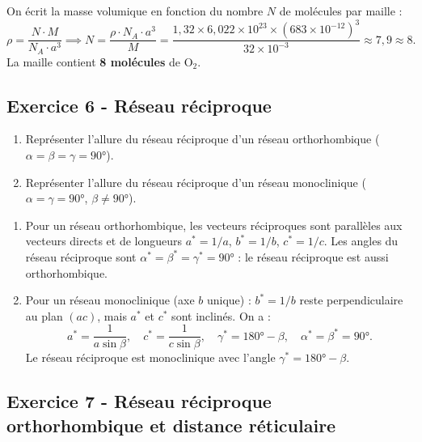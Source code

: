 \documentclass[12pt,a4paper]{article}
\begin{document}
\begin{boitecorrige}
On écrit la masse volumique en fonction du nombre $N$ de molécules par maille :
\[
\rho = \frac{N\cdot M}{N_A\cdot a^3}
\implies N = \frac{\rho\cdot N_A\cdot a^3}{M}
= \frac{1{,}32 \times 6{,}022\times10^{23} \times (683\times10^{-12})^3}{32\times10^{-3}}
\approx 7{,}9 \approx 8.
\]
La maille contient \textbf{8 molécules} de $\text{O}_2$.
\end{boitecorrige}

\subsection*{Exercice 6 - Réseau réciproque \niveau{\moyen}}

\begin{boiteexercice}
\niveau{\moyen}
\begin{enumerate}
  \item Représenter l'allure du réseau réciproque d'un réseau orthorhombique ($\alpha=\beta=\gamma=90°$).
  \item Représenter l'allure du réseau réciproque d'un réseau monoclinique ($\alpha=\gamma=90°$, $\beta\neq90°$).
\end{enumerate}
\end{boiteexercice}

\begin{boitecorrige}
\begin{enumerate}
\item Pour un réseau orthorhombique, les vecteurs réciproques sont parallèles aux vecteurs directs et de longueurs $a^*=1/a$, $b^*=1/b$, $c^*=1/c$. Les angles du réseau réciproque sont $\alpha^*=\beta^*=\gamma^*=90°$ : le réseau réciproque est aussi orthorhombique.

\item Pour un réseau monoclinique (axe $b$ unique) : $b^*=1/b$ reste perpendiculaire au plan $(ac)$, mais $a^*$ et $c^*$ sont inclinés. On a :
\[
a^* = \frac{1}{a\sin\beta},\quad c^* = \frac{1}{c\sin\beta},\quad \gamma^* = 180°-\beta,\quad \alpha^*=\beta^*=90°.
\]
Le réseau réciproque est monoclinique avec l'angle $\gamma^* = 180°-\beta$.
\end{enumerate}
\end{boitecorrige}

\subsection*{Exercice 7 - Réseau réciproque orthorhombique et distance réticulaire \niveau{\moyen}}
\end{document}
